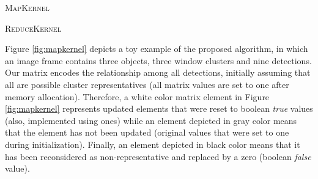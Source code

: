\begin{algorithm}[t]
\DontPrintSemicolon
\SetAlgoNoLine
{}
\caption{\label{alg:map}\textsc{MapKernel}\label{IR}}
\end{algorithm}

\begin{algorithm}[t]
\DontPrintSemicolon
\SetAlgoNoLine
{}
\caption{\label{alg:reduce}\textsc{ReduceKernel}\label{IR}}
\end{algorithm}

Figure \ref{fig:mapkernel} depicts a toy example of the proposed algorithm, in which an image frame contains
three objects, three window clusters and nine detections. Our matrix encodes the relationship 
among all detections, initially assuming that all are possible cluster representatives (all matrix values are set to one after 
memory allocation). Therefore, a white color matrix element in Figure \ref{fig:mapkernel} represents updated elements that were 
reset to boolean \emph{true} values (also, implemented using ones) while an element depicted in gray color means that the element 
has not been updated (original values that were set to one during initialization). Finally, an element depicted in black color 
means that it has been reconsidered as non-representative and replaced by a zero (boolean \emph{false} value).

